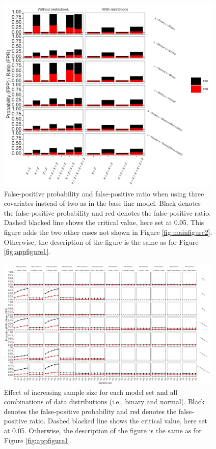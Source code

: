 \begin{figure}[ht!]
\includegraphics[width=1\textwidth]{R/Analysis/Result/Figures/Figure1CSI.jpeg}
\centering
\caption{False-positive probability and false-positive ratio when using three covariates instead of two as in the base line model. Black denotes the false-positive probability and red denotes the false-positive ratio. Dashed blacked line shows the critical value, here set at 0.05. This figure adds the two other cases not shown in Figure \ref{fig:mainfigure2}. Otherwise, the description of the figure is the same as for Figure \ref{fig:appfigure1}.
}
\label{fig:appfigure5}
\end{figure}

\begin{landscape}
\begin{figure}[ht!]
\includegraphics[scale=0.16]{R/Analysis/Result/Figures/Figure1DSI.jpeg}
\centering
\caption{Effect of increasing sample size for each model set and all combinations of data distributions (i.e., binary and normal). Black denotes the false-positive probability and red denotes the false-positive ratio. Dashed blacked line shows the critical value, here set at 0.05. Otherwise, the description of the figure is the same as for Figure \ref{fig:appfigure1}. 
}
\label{fig:appfigure6}
\end{figure}
\end{landscape}

